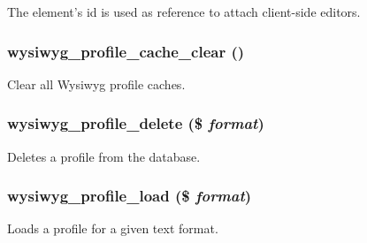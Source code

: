 The element's id is used as reference to attach client-\/side editors. \hypertarget{wysiwyg_8module_a7667d1f74833f277925cb4b87949365b}{
\subsubsection[{wysiwyg\_\-profile\_\-cache\_\-clear}]{\setlength{\rightskip}{0pt plus 5cm}wysiwyg\_\-profile\_\-cache\_\-clear ()}}
\label{wysiwyg_8module_a7667d1f74833f277925cb4b87949365b}
Clear all Wysiwyg profile caches. \hypertarget{wysiwyg_8module_ab4fc9985468b9ba8ecce5bbae05213fe}{
\subsubsection[{wysiwyg\_\-profile\_\-delete}]{\setlength{\rightskip}{0pt plus 5cm}wysiwyg\_\-profile\_\-delete (\$ {\em format})}}
\label{wysiwyg_8module_ab4fc9985468b9ba8ecce5bbae05213fe}
Deletes a profile from the database. \hypertarget{wysiwyg_8module_af7372d5c943dee94e03b2f0c50056638}{
\subsubsection[{wysiwyg\_\-profile\_\-load}]{\setlength{\rightskip}{0pt plus 5cm}wysiwyg\_\-profile\_\-load (\$ {\em format})}}
\label{wysiwyg_8module_af7372d5c943dee94e03b2f0c50056638}
Loads a profile for a given text format.

